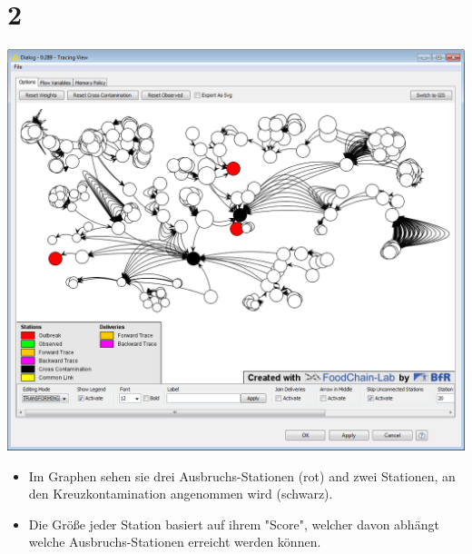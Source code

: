 \documentclass{beamer}
\begin{document}
\section{2}
\begin{frame}
	\begin{center}
  		\includegraphics[height=0.6\textheight]{2.png}
	\end{center}
	\begin{itemize}
		\item Im Graphen sehen sie drei Ausbruchs-Stationen (rot) and zwei Stationen, an den Kreuzkontamination angenommen wird (schwarz).
		\item Die Größe jeder Station basiert auf ihrem "Score", welcher davon abhängt welche Ausbruchs-Stationen erreicht werden können.
	\end{itemize}
\end{frame}
\end{document}
